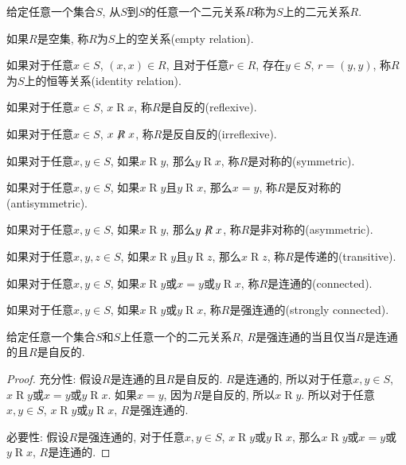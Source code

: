 \begin{definition}
	给定任意一个集合$S$, 从$S$到$S$的任意一个二元关系$R$称为$S$上的二元关系$R$.

	如果$R$是空集, 称$R$为$S$上的空关系(empty relation).

	如果对于任意$x\in S$, $(x,x)\in R$, 且对于任意$r\in R$, 存在$y\in S$, $r=(y,y)$, 称$R$为$S$上的恒等关系(identity relation).

	如果对于任意$x\in S$, $x\mathrel Rx$, 称$R$是自反的(reflexive).

	如果对于任意$x\in S$, $x\not \mathrel Rx$, 称$R$是反自反的(irreflexive).

	如果对于任意$x,y\in S$, 如果$x\mathrel Ry$, 那么$y\mathrel Rx$, 称$R$是对称的(symmetric).

	如果对于任意$x,y\in S$, 如果$x\mathrel Ry$且$y\mathrel Rx$, 那么$x=y$, 称$R$是反对称的(antisymmetric).

	如果对于任意$x,y\in S$, 如果$x\mathrel Ry$, 那么$y\not \mathrel Rx$, 称$R$是非对称的(asymmetric).

	如果对于任意$x,y,z\in S$, 如果$x\mathrel Ry$且$y\mathrel Rz$, 那么$x\mathrel Rz$, 称$R$是传递的(transitive).

	如果对于任意$x,y\in S$, 如果$x\mathrel Ry$或$x=y$或$y\mathrel Rx$, 称$R$是连通的(connected).

	如果对于任意$x,y\in S$, 如果$x\mathrel Ry$或$y\mathrel Rx$, 称$R$是强连通的(strongly connected).
\end{definition}

\begin{proposition}
	给定任意一个集合$S$和$S$上任意一个的二元关系$R$, $R$是强连通的当且仅当$R$是连通的且$R$是自反的.
\end{proposition}

\begin{proof}
	充分性: 假设$R$是连通的且$R$是自反的. $R$是连通的, 所以对于任意$x,y\in S$, $x\mathrel Ry$或$x=y$或$y\mathrel Rx$. 如果$x=y$, 因为$R$是自反的, 所以$x\mathrel Ry$. 所以对于任意$x,y\in S$, $x\mathrel Ry$或$y\mathrel Rx$, $R$是强连通的.

	必要性: 假设$R$是强连通的, 对于任意$x,y\in S$, $x\mathrel Ry$或$y\mathrel Rx$, 那么$x\mathrel Ry$或$x=y$或$y\mathrel Rx$, $R$是连通的.
\end{proof}